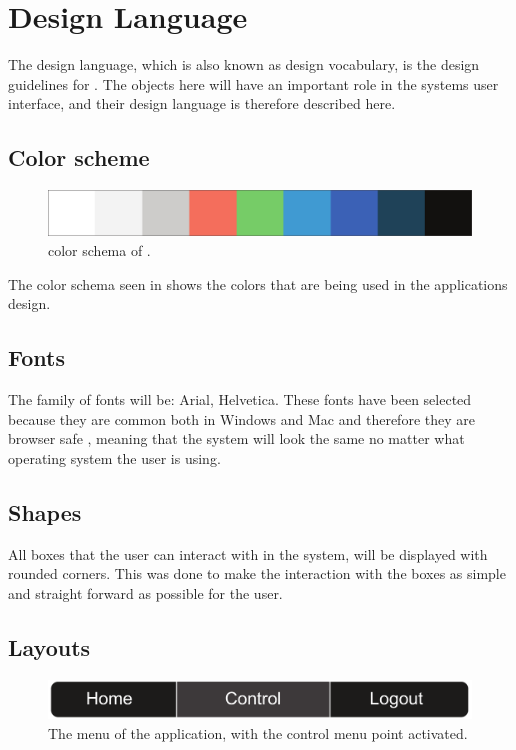 \section{Design Language}
The design language, which is also known as design vocabulary, is the design guidelines for \projectname{}. 
The objects here will have an important role in the systems user interface, and their design language is therefore described here.

\subsection{Color scheme}
\begin{figure}[htb]
    \centering
    \includegraphics[width=\textwidth]{gfx/color_schema.pdf}
    \caption{color schema of \projectname{}.}
    \label{fig:color_schema}
\end{figure}

The color schema seen in  shows the colors that are being used in the applications design. 

\subsection{Fonts}
The family of fonts will be: Arial, Helvetica. 
These fonts have been selected because they are common both in Windows and Mac and therefore they are browser safe \cite{common_fonts}, meaning that the system will look the same no matter what operating system the user is using.

\subsection{Shapes}
All boxes that the user can interact with in the system, will be displayed with rounded corners.
This was done to make the interaction with the boxes as simple and straight forward as possible for the user.

\subsection{Layouts}
\begin{figure}[htb]
    \centering
    \includegraphics[width=\textwidth]{gfx/menu.pdf}
    \caption{The menu of the application, with the control menu point activated.}
    \label{fig:menu_design}
\end{figure}


